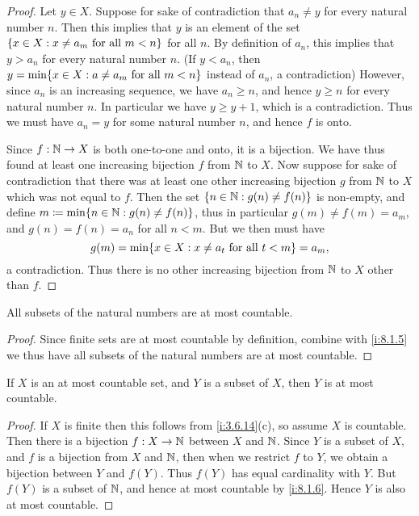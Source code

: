 \begin{proof}
  Let \(y \in X\).
  Suppose for sake of contradiction that \(a_n \neq y\) for every natural number \(n\).
  Then this implies that \(y\) is an element of the set \(\left\lbrace x \in X : x \neq a_m \text{ for all } m < n\right\rbrace\) for all \(n\).
  By definition of \(a_n\), this implies that \(y > a_n\) for every natural number \(n\).
  (If \(y < a_n\), then \(y = \min\set{x \in X : a \neq a_m \text{ for all } m < n}\) instead of \(a_n\), a contradiction)
  However, since \(a_n\) is an increasing sequence, we have \(a_n \geq n\), and hence \(y \geq n\) for every natural number \(n\).
  In particular we have \(y \geq y + 1\), which is a contradiction.
  Thus we must have \(a_n = y\) for some natural number \(n\), and hence \(f\) is onto.

  Since \(f : \mathbb{N} \to X\) is both one-to-one and onto, it is a bijection.
  We have thus found at least one increasing bijection \(f\) from \(\mathbb{N}\) to \(X\).
  Now suppose for sake of contradiction that there was at least one other increasing bijection \(g\) from \(\mathbb{N}\) to \(X\) which was not equal to \(f\).
  Then the set \(\left\lbrace n \in \mathbb{N} : g(n) \neq f(n)\right\rbrace\) is non-empty, and define \(m \coloneqq \min\set{n \in \N : g(n) \neq f(n)}\), thus in particular \(g(m) \neq f(m) = a_m\), and \(g(n) = f(n) = a_n\) for all \(n < m\).
  But we then must have
  \[
    g(m) = \min\set{x \in X : x \neq a_t \text{ for all } t < m} = a_m,
  \]
  a contradiction.
  Thus there is no other increasing bijection from \(\mathbb{N}\) to \(X\) other than \(f\).
\end{proof}

\begin{cor}\label{i:8.1.6}
  All subsets of the natural numbers are at most countable.
\end{cor}

\begin{proof}
  Since finite sets are at most countable by definition, combine with \cref{i:8.1.5} we thus have all subsets of the natural numbers are at most countable.
\end{proof}

\begin{cor}\label{i:8.1.7}
  If \(X\) is an at most countable set, and \(Y\) is a subset of \(X\), then \(Y\) is at most countable.
\end{cor}

\begin{proof}
  If \(X\) is finite then this follows from \cref{i:3.6.14}(c), so assume \(X\) is countable.
  Then there is a bijection \(f : X \to \mathbb{N}\) between \(X\) and \(\mathbb{N}\).
  Since \(Y\) is a subset of \(X\), and \(f\) is a bijection from \(X\) and \(\mathbb{N}\), then when we restrict \(f\) to \(Y\), we obtain a bijection between \(Y\) and \(f(Y)\).
  Thus \(f(Y)\) has equal cardinality with \(Y\).
  But \(f(Y)\) is a subset of \(\mathbb{N}\), and hence at most countable by \cref{i:8.1.6}.
  Hence \(Y\) is also at most countable.
\end{proof}

